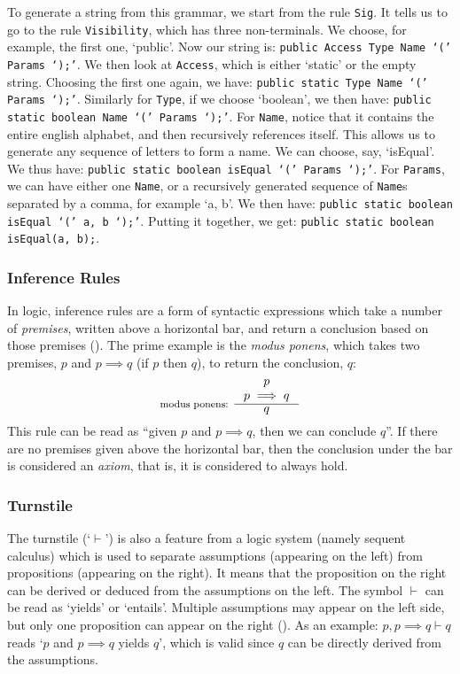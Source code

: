 To generate a string from this grammar, we start from the rule \texttt{Sig}. It tells us to go to the rule \texttt{Visibility}, which has three non-terminals. We choose, for example, the first one, `public'. Now our string is: \texttt{public Access Type Name `(' Params `);'}. We then look at \texttt{Access}, which is either `static' or the empty string. Choosing the first one again, we have: \texttt{public static Type Name `(' Params `);'}. Similarly for \texttt{Type}, if we choose `boolean', we then have: \texttt{public static boolean Name `(' Params `);'}. For \texttt{Name}, notice that it contains the entire english alphabet, and then recursively references itself. This allows us to generate any sequence of letters to form a name. We can choose, say, `isEqual'. We thus have: \texttt{public static boolean isEqual `(' Params `);'}. For \texttt{Params}, we can have either one \texttt{Name}, or a recursively generated sequence of \texttt{Name}s separated by a comma, for example `a, b'. We then have: \texttt{public static boolean isEqual `(' a, b `);'}. Putting it together, we get: \texttt{public static boolean isEqual(a, b);}.

\subsubsection*{Inference Rules}
In logic, inference rules are a form of syntactic expressions which take a number of \textit{premises}, written above a horizontal bar, and return a conclusion based on those premises (\cite{splinter1}). The prime example is the \textit{modus ponens}, which takes two premises, $p$ and $p \implies q$ (if $p$ then $q$), to return the conclusion, $q$:
\begin{align*}
\inference[modus ponens: ]{
  p \\
  p \implies q
}{q}
\end{align*}
This rule can be read as ``given $p$ and $p \implies q$, then we can conclude $q$''. If there are no premises given above the horizontal bar, then the conclusion under the bar is considered an \textit{axiom}, that is, it is considered to always hold.

\subsubsection*{Turnstile}
The turnstile (`$\vdash$') is also a feature from a logic system (namely sequent calculus) which is used to separate assumptions (appearing on the left) from propositions (appearing on the right). It means that the proposition on the right can be derived or deduced from the assumptions on the left. The symbol $\vdash$ can be read as `yields' or `entails'. Multiple assumptions may appear on the left side, but only one proposition can appear on the right (\cite{kleene}). As an example: $p, p \implies q \vdash q$ reads `$p$ and $p \implies q$ yields $q$', which is valid since $q$ can be directly derived from the assumptions.

